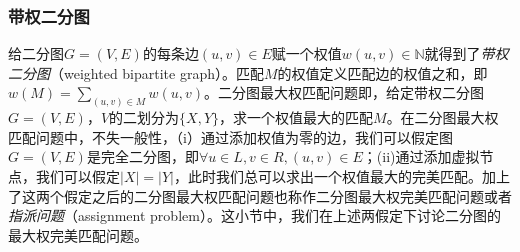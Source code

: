 \documentclass[a4paper]{ctexbook}
\begin{document}
  \subsubsection*{带权二分图}
  给二分图$G=(V,E)$的每条边$(u,v)\in E$赋一个权值$w(u,v)\in\mathbb{N}$就得到了\emph{带权二分图}（weighted bipartite graph）。匹配$M$的权值定义匹配边的权值之和，即$w(M)=\sum_{(u,v)\in M}w(u,v)$。二分图最大权匹配问题即，给定带权二分图$G=(V,E)$，$V$的二划分为$\{X,Y\}$，求一个权值最大的匹配$M$。在二分图最大权匹配问题中，不失一般性，（i）通过添加权值为零的边，我们可以假定图$G=(V,E)$是完全二分图，即$\forall u\in L,v\in R,(u,v)\in E$；(ii)通过添加虚拟节点，我们可以假定$|X|=|Y|$，此时我们总可以求出一个权值最大的完美匹配。加上了这两个假定之后的二分图最大权匹配问题也称作二分图最大权完美匹配问题或者\emph{指派问题}（assignment problem）。这小节中，我们在上述两假定下讨论二分图的最大权完美匹配问题。
\end{document}

